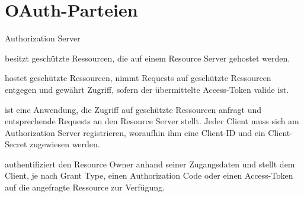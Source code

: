 \section{OAuth-Parteien}\label{Parteien}
\begin{labeling}{Authorization Server}
    \item [Resource Owner] besitzt geschützte Ressourcen, die auf einem Resource
    Server gehostet werden.
    \item [Resource Server] hostet geschützte Ressourcen, nimmt Requests auf
    geschützte Ressourcen entgegen und gewährt Zugriff, sofern der übermittelte
    Access-Token valide ist.
    \item [Client Application] ist eine Anwendung, die Zugriff auf geschützte
    Ressourcen anfragt und entsprechende Requests an den Resource Server stellt.
    Jeder Client muss sich am Authorization Server registrieren, woraufhin ihm
    eine Client-ID und ein Client-Secret zugewiesen werden.
    \item[Authorization Server] authentifiziert den Resource Owner anhand seiner
    Zugangsdaten und stellt dem Client, je nach \gls{Grant Type}, einen
    Authorization Code oder einen Access-Token auf die angefragte Ressource zur
    Verfügung. 
\end{labeling}
